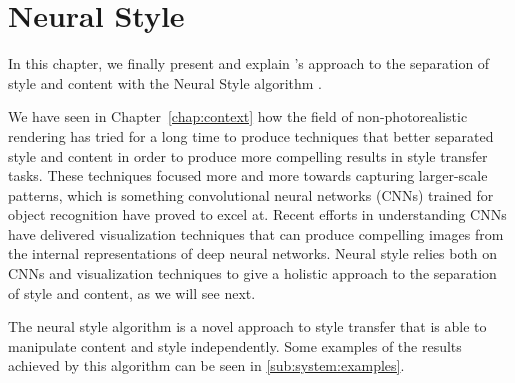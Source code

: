 
\chapter{Neural Style}
\label{chap:system}




In this chapter, we finally present and explain \citeauthor{Gatys2015B}'s approach to the separation of style and content with the Neural Style algorithm \cite{Gatys2015B}.

We have seen in Chapter~\ref{chap:context} how the field of non-photorealistic rendering has tried for a long time to produce techniques that better separated style and content in order to produce more compelling results in style transfer tasks.
These techniques focused more and more towards capturing larger-scale patterns, which is something convolutional neural networks (CNNs) trained for object recognition have proved to excel at.
Recent efforts in understanding CNNs have delivered visualization techniques that can produce compelling images from the internal representations of deep neural networks.
Neural style relies both on CNNs and visualization techniques to give a holistic approach to the separation of style and content, as we will see next.

The neural style algorithm is a novel approach to style transfer that is able to manipulate content and style independently.
Some examples of the results achieved by this algorithm can be seen in \autoref{sub:system:examples}.

